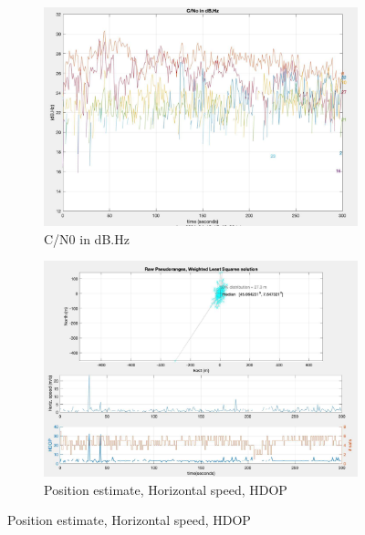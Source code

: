 \begin{figure}[H]
  \begin{subfigure}{.22\textwidth}
  \centering
    \includegraphics[width=1\linewidth]{images/interference_figure_3.pdf}
    \caption{C/N0 in dB.Hz}
    \label{fig:interference_figure_3}
  \end{subfigure}
  \begin{subfigure}{.22\textwidth}
  \centering
    \includegraphics[width=1\linewidth]{images/interference_figure_4.pdf}
    \caption{Position estimate, Horizontal speed, HDOP}
    \label{fig:interference_figure_4}
  \end{subfigure}
  \vspace{10pt}
\end{figure}
